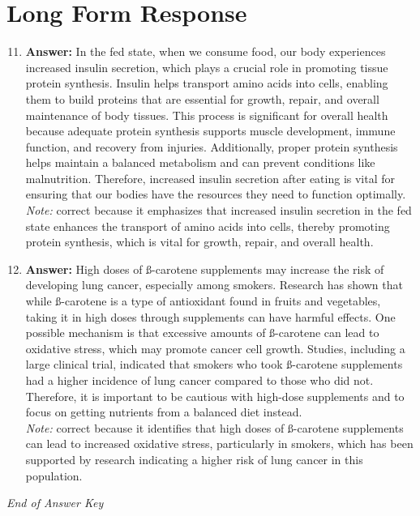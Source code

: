 \documentclass[12pt]{article}
\begin{document}
\section*{Long Form Response}
\begin{enumerate}[label=\arabic*.]
\setcounter{enumi}{10}
\item \textbf{Answer:} In the fed state, when we consume food, our body experiences increased insulin secretion, which plays a crucial role in promoting tissue protein synthesis. Insulin helps transport amino acids into cells, enabling them to build proteins that are essential for growth, repair, and overall maintenance of body tissues. This process is significant for overall health because adequate protein synthesis supports muscle development, immune function, and recovery from injuries. Additionally, proper protein synthesis helps maintain a balanced metabolism and can prevent conditions like malnutrition. Therefore, increased insulin secretion after eating is vital for ensuring that our bodies have the resources they need to function optimally.
\\ \textit{Note:} correct because it emphasizes that increased insulin secretion in the fed state enhances the transport of amino acids into cells, thereby promoting protein synthesis, which is vital for growth, repair, and overall health.
\item \textbf{Answer:} High doses of ß-carotene supplements may increase the risk of developing lung cancer, especially among smokers. Research has shown that while ß-carotene is a type of antioxidant found in fruits and vegetables, taking it in high doses through supplements can have harmful effects. One possible mechanism is that excessive amounts of ß-carotene can lead to oxidative stress, which may promote cancer cell growth. Studies, including a large clinical trial, indicated that smokers who took ß-carotene supplements had a higher incidence of lung cancer compared to those who did not. Therefore, it is important to be cautious with high-dose supplements and to focus on getting nutrients from a balanced diet instead.
\\ \textit{Note:} correct because it identifies that high doses of ß-carotene supplements can lead to increased oxidative stress, particularly in smokers, which has been supported by research indicating a higher risk of lung cancer in this population.
\end{enumerate}

\vfill
\noindent\textit{End of Answer Key}
\end{document}
